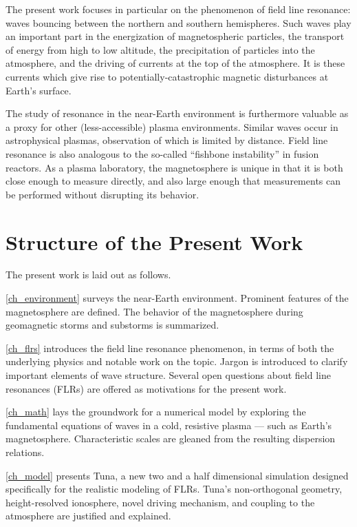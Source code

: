 The present work focuses in particular on the phenomenon of field line
resonance: \Alfven waves bouncing between the northern and southern
hemispheres. Such waves play an important part in the energization of
magnetospheric particles, the transport of energy from high to low altitude,
the precipitation of particles into the atmosphere, and the driving of currents
at the top of the atmosphere. It is these currents which give rise to
potentially-catastrophic magnetic disturbances at Earth's surface. 

The study of resonance in the near-Earth environment is furthermore valuable as
a proxy for other (less-accessible) plasma environments. Similar waves occur in
astrophysical plasmas, observation of which is limited by distance. Field line
resonance is also analogous to the so-called ``fishbone instability'' in fusion
reactors. As a plasma laboratory, the magnetosphere is unique in that it is
both close enough to measure directly, and also large enough that measurements
can be performed without disrupting its behavior. 

\section{Structure of the Present Work}

The present work is laid out as follows. 

\cref{ch_environment} surveys the near-Earth environment. Prominent features of
the magnetosphere are defined. The behavior of the magnetosphere during
geomagnetic storms and substorms is summarized. 

\cref{ch_flrs} introduces the field line resonance phenomenon, in terms of both
the underlying physics and notable work on the topic. Jargon is introduced to
clarify important elements of wave structure. Several open questions about
field line resonances (FLRs) are offered as motivations for the present work. 

\cref{ch_math} lays the groundwork for a numerical model by exploring the
fundamental equations of waves in a cold, resistive plasma --- such as
Earth's magnetosphere. Characteristic scales are gleaned from the resulting
dispersion relations. 

\cref{ch_model} presents Tuna, a new two and a half dimensional simulation
designed specifically for the realistic modeling of FLRs. Tuna's
non-orthogonal geometry, height-resolved ionosphere, novel driving mechanism,
and coupling to the atmosphere are justified and explained. 

